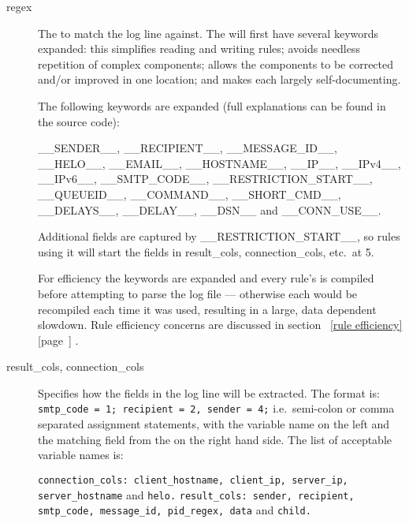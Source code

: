 \documentclass[a4paper,12pt,draft]{article}
\newcommand{\refwithpage}[1]{%
    \empty{}\ref{#1} [page~\pageref{#1}]%
}
\newcommand{\tab}[0]{%
    \hspace*{2em}%
}
\begin{document}
\begin{description}
    \item [regex] The \regex{} to match the log line against.  The \regex{}
        will first have several keywords expanded: this simplifies reading
        and writing rules; avoids needless repetition of complex \regex{}
        components; allows the components to be corrected and/or improved
        in one location; and makes each \regex{} largely self-documenting.

        The following keywords are expanded (full explanations can be found
        in the source code):

        \_\_SENDER\_\_, \_\_RECIPIENT\_\_, \_\_MESSAGE\_ID\_\_,
        \_\_HELO\_\_, \newline \_\_EMAIL\_\_, \_\_HOSTNAME\_\_, \_\_IP\_\_,
        \_\_IPv4\_\_, \_\_IPv6\_\_, \newline \_\_SMTP\_CODE\_\_,
        \_\_RESTRICTION\_START\_\_, \_\_QUEUEID\_\_, \newline
        \_\_COMMAND\_\_, \_\_SHORT\_CMD\_\_, \_\_DELAYS\_\_, \_\_DELAY\_\_,
        \_\_DSN\_\_ and \_\_CONN\_USE\_\_.

        Additional fields are captured by \_\_RESTRICTION\_START\_\_, so
        rules using it will start the fields in result\_cols,
        connection\_cols, etc.\ at 5.

        For efficiency the keywords are expanded and every rule's \regex{}
        is compiled before attempting to parse the log file --- otherwise
        each \regex{} would be recompiled each time it was used, resulting
        in a large, data dependent slowdown.  Rule efficiency concerns are
        discussed in section~\refwithpage{rule efficiency}.

    \item [result\_cols, connection\_cols] Specifies how the fields in the
        log line will be extracted.  The format is: \newline
        \texttt{smtp\_code = 1; recipient = 2, sender = 4;} \newline i.e.\
        semi-colon or comma separated assignment statements, with the
        variable name on the left and the matching field from the \regex{}
        on the right hand side.  The list of acceptable variable names is:

        \texttt{connection\_cols: client\_hostname, client\_ip, server\_ip,
        \newline \tab{} server\_hostname} and \texttt{helo.\newline}
        \texttt{result\_cols: sender, recipient, smtp\_code, message\_id,
        \newline \tab{} pid\_regex, data} and \texttt{child.}


\end{description}
\end{document}
